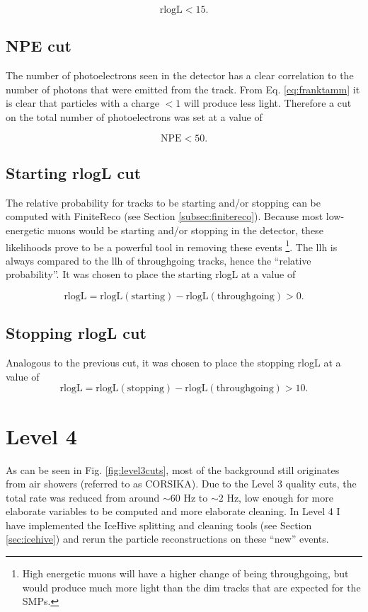 \begin{equation}
\textrm{rlogL} < 15.
\end{equation}

\subsection{NPE cut}
The number of photoelectrons seen in the detector has a clear correlation to the number of photons that were emitted from the track. From Eq. \ref{eq:franktamm} it is clear that particles with a charge $< 1$ will produce less light. Therefore a cut on the total number of photoelectrons was set at a value of 

\begin{equation}
\textrm{NPE} < 50.
\end{equation} 


\subsection{Starting rlogL cut}
The relative probability for tracks to be starting and/or stopping can be computed with FiniteReco (see Section \ref{subsec:finitereco}). Because most low-energetic muons would be starting and/or stopping in the detector, these likelihoods prove to be a powerful tool in removing these events \footnote{High energetic muons will have a higher change of being throughgoing, but would produce much more light than the dim tracks that are expected for the SMPs.}. The llh is always compared to the llh of throughgoing tracks, hence the ``relative probability''. It was chosen to place the starting rlogL at a value of 

\begin{equation}
\textrm{rlogL} = \textrm{rlogL}(\textrm{starting}) - \textrm{rlogL}(\textrm{throughgoing}) > 0. 
\end{equation}

\subsection{Stopping rlogL cut}
Analogous to the previous cut, it was chosen to place the stopping rlogL at a value of
\begin{equation}
\textrm{rlogL} = \textrm{rlogL}(\textrm{stopping}) - \textrm{rlogL}(\textrm{throughgoing}) > 10. 
\end{equation}


\section{Level 4}
As can be seen in Fig. \ref{fig:level3cuts}, most of the background still originates from air showers (referred to as CORSIKA). Due to the Level 3 quality cuts, the total rate was reduced from around $\sim 60$ Hz to $\sim2$ Hz, low enough for more elaborate variables to be computed and more elaborate cleaning. In Level 4 I have implemented the IceHive splitting and cleaning tools (see Section \ref{sec:icehive}) and rerun the particle reconstructions on these ``new'' events. 




